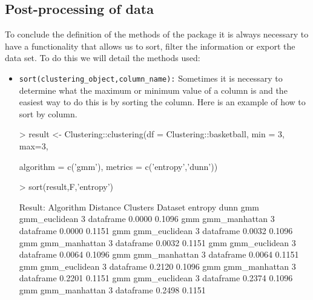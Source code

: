 \subsection {Post-processing of data}

To conclude the definition of the methods of the package it is always necessary to have a functionality that allows us to sort, filter the information or export the data set. To do this we will detail the methods used:

\begin{itemize}
  \item \texttt{sort(clustering\_object,column\_name):} Sometimes it is necessary to determine what the maximum or minimum value of a column is and the easiest way to do this is by sorting the column. Here is an example of how to sort by column.
  \begin{Schunk}
\begin{Sinput}
> result <- Clustering::clustering(df = Clustering::basketball, min = 3, max=3,
\end{Sinput}
\begin{Sinput}
           algorithm = c('gmm'), metrics = c('entropy','dunn'))
 \end{Sinput}
\end{Schunk}
\begin{Schunk}
\begin{Sinput}
>  sort(result,F,'entropy')
\end{Sinput}
\begin{Soutput}
Result:
 Algorithm    Distance   Clusters   Dataset   entropy  dunn
   gmm    gmm_euclidean   3       dataframe  0.0000  0.1096
   gmm    gmm_manhattan   3       dataframe  0.0000  0.1151
   gmm    gmm_euclidean   3       dataframe  0.0032  0.1096
   gmm    gmm_manhattan   3       dataframe  0.0032  0.1151
   gmm    gmm_euclidean   3       dataframe  0.0064  0.1096
   gmm    gmm_manhattan   3       dataframe  0.0064  0.1151
   gmm    gmm_euclidean   3       dataframe  0.2120  0.1096
   gmm    gmm_manhattan   3       dataframe  0.2201  0.1151
   gmm    gmm_euclidean   3       dataframe  0.2374  0.1096
   gmm    gmm_manhattan   3       dataframe  0.2498  0.1151



\end{Soutput}
\end{Schunk}
\end{itemize}
